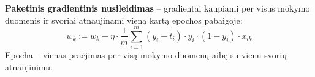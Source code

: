 \textbf{Paketinis gradientinis nusileidimas} – gradientai kaupiami per visus mokymo duomenis ir svoriai atnaujinami vieną kartą epochos pabaigoje:
$$w_k := w_k - \eta \cdot \frac{1}{m} \sum_{i=1}^{m} (y_i - t_i) \cdot y_i \cdot (1 - y_i) \cdot x_{ik}$$
Epocha – vienas praėjimas per visą mokymo duomenų aibę su vienu svorių atnaujinimu.